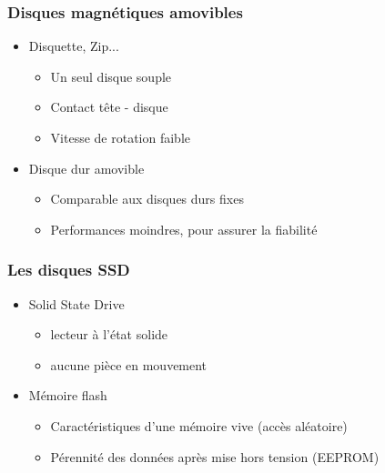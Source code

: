 \begin{frame}
\frametitle{Disques magnétiques amovibles}
\begin{itemize}
\item Disquette, Zip...
\begin{itemize}
\item Un seul disque souple
\item Contact tête - disque
\item Vitesse de rotation faible
\end{itemize}
\item Disque dur amovible
\begin{itemize}
\item Comparable aux disques durs fixes
\item Performances moindres, pour assurer la fiabilité
\end{itemize}
\end{itemize}
\end{frame}


\begin{frame}
\frametitle{Les disques SSD}
\begin{itemize}
\item Solid State Drive
\begin{itemize}
\item lecteur à l'état solide
\item aucune pièce en mouvement
\end{itemize}

\item Mémoire flash
\begin{itemize}
\item Caractéristiques d'une mémoire vive (accès aléatoire)
\item Pérennité des données après mise hors tension (EEPROM)
\end{itemize}
\end{itemize}
\end{frame}


